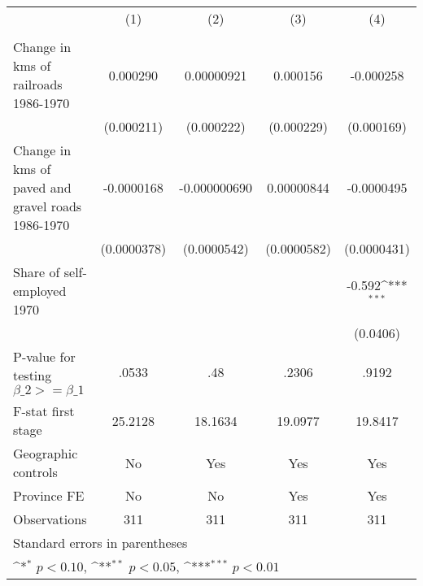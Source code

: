 {
\def\sym#1{\ifmmode^{#1}\else\(^{#1}\)\fi}
\begin{tabular}{l*{4}{c}}
\hline\hline
                &\multicolumn{1}{c}{(1)}&\multicolumn{1}{c}{(2)}&\multicolumn{1}{c}{(3)}&\multicolumn{1}{c}{(4)}\\
                &\multicolumn{1}{c}{}&\multicolumn{1}{c}{}&\multicolumn{1}{c}{}&\multicolumn{1}{c}{}\\
\hline
Change in kms of railroads 1986-1970& 0.000290         &0.00000921         & 0.000156         &-0.000258         \\
                &(0.000211)         &(0.000222)         &(0.000229)         &(0.000169)         \\
[1em]
Change in kms of paved and gravel roads 1986-1970&-0.0000168         &-0.000000690         &0.00000844         &-0.0000495         \\
                &(0.0000378)         &(0.0000542)         &(0.0000582)         &(0.0000431)         \\
[1em]
Share of self-employed 1970&                  &                  &                  &   -0.592\sym{***}\\
                &                  &                  &                  & (0.0406)         \\
\hline
P-value for testing $\beta\_{2} >= \beta\_{1}$&    .0533         &      .48         &    .2306         &    .9192         \\
F-stat first stage&  25.2128         &  18.1634         &  19.0977         &  19.8417         \\
Geographic controls&       No         &      Yes         &      Yes         &      Yes         \\
Province FE     &       No         &       No         &      Yes         &      Yes         \\
Observations    &      311         &      311         &      311         &      311         \\
\hline\hline
\multicolumn{5}{l}{\footnotesize Standard errors in parentheses}\\
\multicolumn{5}{l}{\footnotesize \sym{*} \(p<0.10\), \sym{**} \(p<0.05\), \sym{***} \(p<0.01\)}\\
\end{tabular}
}
